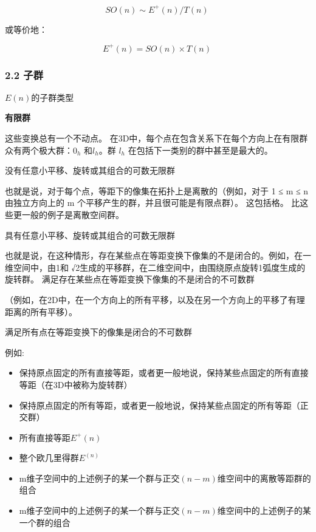 \begin{equation}
SO(n) \sim E^+(n)/T(n)~
\end{equation}

或等价地：

\begin{equation}
E^{+}(n) = SO(n) \times T(n)~
\end{equation}

\subsubsection{2.2 子群}

$E(n)$的子群类型

\textbf{有限群}

这些变换总有一个不动点。 在3D中，每个点在包含关系下在每个方向上在有限群众有两个极大群：$0_h$ 和$l_h$。群 $l_h$ 在包括下一类别的群中甚至是最大的。

没有任意小平移、旋转或其组合的可数无限群

也就是说，对于每个点，等距下的像集在拓扑上是离散的（例如，对于 1 ≤ m ≤ n 由独立方向上的 m 个平移产生的群，并且很可能是有限点群）。 这包括格。 比这些更一般的例子是离散空间群。

具有任意小平移、旋转或其组合的可数无限群

也就是说，在这种情形，存在某些点在等距变换下像集的不是闭合的。例如，在一维空间中，由1和 √2生成的平移群，在二维空间中，由围绕原点旋转1弧度生成的旋转群。
满足存在某些点在等距变换下像集的不是闭合的不可数群

（例如，在2D中，在一个方向上的所有平移，以及在另一个方向上的平移了有理距离的所有平移）。

满足所有点在等距变换下的像集是闭合的不可数群

例如:

\begin{itemize}
\item 保持原点固定的所有直接等距，或者更一般地说，保持某些点固定的所有直接等距（在3D中被称为旋转群）
\item 保持原点固定的所有等距，或者更一般地说，保持某些点固定的所有等距（正交群）
\item 所有直接等距$E^+(n)$
\item 整个欧几里得群$E^(n)$
\item m维子空间中的上述例子的某一个群与正交$(n-m)$维空间中的离散等距群的组合
\item m维子空间中的上述例子的某一个群与正交$(n-m)$维空间中的上述例子的某一个群的组合
\end{itemize}

